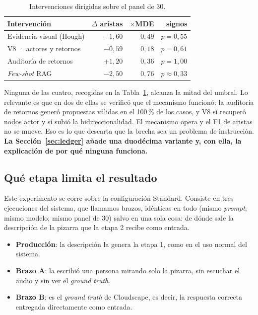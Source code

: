 \documentclass[a4paper, twocolumn, 10pt]{IEEEtran}
\newcommand{\nuevo}[1]{{\bfseries #1}}
\begin{document}
\begin{table}[H]
\centering\small
\caption{Intervenciones dirigidas sobre el panel de 30.}
\label{tab:intervenciones}
\begin{tabular}{lrrr}
\toprule
Intervención & $\Delta$ aristas & $\times$MDE & signos\\
\midrule
Evidencia visual (Hough)   & $-1{,}60$ & $0{,}49$ & $p=0{,}55$\\
V8 · actores y retornos    & $-0{,}59$ & $0{,}18$ & $p=0{,}61$\\
Auditoría de retornos      & $+1{,}20$ & $0{,}36$ & $p=1{,}00$\\
\emph{Few-shot} RAG        & $-2{,}50$ & $0{,}76$ & $p\approx0{,}33$\\
\bottomrule
\end{tabular}
\end{table}

Ninguna de las cuatro, recogidas en la Tabla~\ref{tab:intervenciones},
alcanza la mitad del umbral. Lo relevante es que en dos de ellas
se verificó que el mecanismo funcionó: la auditoría de retornos generó
propuestas válidas en el 100\,\% de los casos, y V8 sí recuperó nodos
actor y sí subió la bidireccionalidad. El mecanismo opera y el F1 de
aristas no se mueve. Eso es lo que descarta que la brecha sea un problema
de instrucción. \nuevo{La Sección~\ref{sec:ledger} añade una duodécima variante y, con
ella, la explicación de por qué ninguna funciona.}

\subsection{Qué etapa limita el resultado}
\label{sec:rq3}

Este experimento se corre sobre la configuración Standard. Consiste en tres ejecuciones del sistema, que llamamos brazos, idénticas en todo (mismo \emph{prompt}; mismo modelo; mismo panel de 30) salvo en una sola cosa: de dónde sale la descripción de la pizarra que la etapa 2 recibe como entrada.

\begin{itemize}\itemsep2pt
\item \textbf{Producción}: la descripción la genera la etapa 1, como en el uso
normal del sistema.
\item \textbf{Brazo A}: la escribió una persona mirando solo la pizarra, sin
escuchar el audio y sin ver el \emph{ground truth}.
\item \textbf{Brazo B}: es el \emph{ground truth} de Cloudscape, es decir, la
respuesta correcta entregada directamente como entrada.
\end{itemize}
\end{document}
